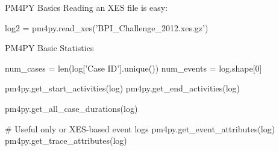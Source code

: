 \documentclass[ignorenonframetext,xcolor=x11names]{beamer}
\begin{document}
\begin{frame}[label=withcode,fragile]{PM4PY Basics}
Reading an XES file is easy:
\footnotesize
\begin{pythoncode}
log2 = pm4py.read_xes('BPI_Challenge_2012.xes.gz')
\end{pythoncode}
\end{frame}

\begin{frame}[label=withcode,fragile]{PM4PY Basic Statistics}
\footnotesize
\begin{pythoncode}
num_cases = len(log['Case ID'].unique())
num_events = log.shape[0]

pm4py.get_start_activities(log)
pm4py.get_end_activities(log)

pm4py.get_all_case_durations(log)

# Useful only or XES-based event logs
pm4py.get_event_attributes(log)
pm4py.get_trace_attributes(log)
\end{pythoncode}
\end{frame}




\end{document}
